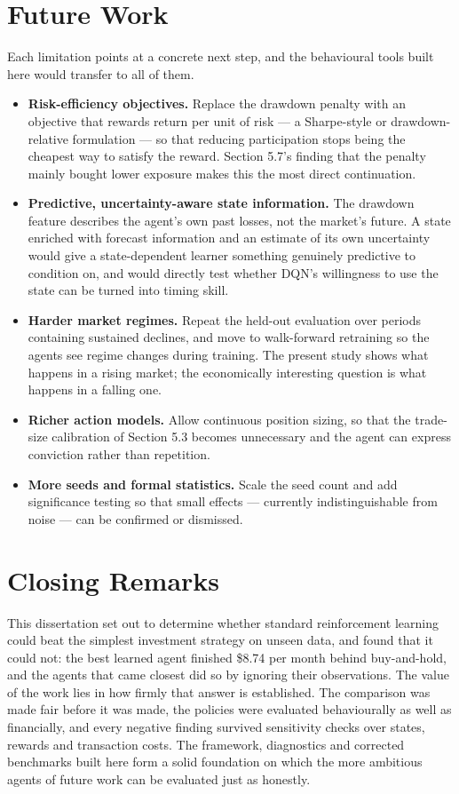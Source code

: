 \section{Future Work}

Each limitation points at a concrete next step, and the behavioural tools
built here would transfer to all of them.

\begin{itemize}
\item
  \textbf{Risk-efficiency objectives.} Replace the drawdown penalty with
  an objective that rewards return per unit of risk --- a Sharpe-style or
  drawdown-relative formulation --- so that reducing participation stops
  being the cheapest way to satisfy the reward. Section 5.7's finding
  that the penalty mainly bought lower exposure makes this the most
  direct continuation.
\item
  \textbf{Predictive, uncertainty-aware state information.} The drawdown
  feature describes the agent's own past losses, not the market's
  future. A state enriched with forecast information and an estimate of
  its own uncertainty would give a state-dependent learner something
  genuinely predictive to condition on, and would directly test whether
  DQN's willingness to use the state can be turned into timing skill.
\item
  \textbf{Harder market regimes.} Repeat the held-out evaluation over
  periods containing sustained declines, and move to walk-forward
  retraining so the agents see regime changes during training. The
  present study shows what happens in a rising market; the economically
  interesting question is what happens in a falling one.
\item
  \textbf{Richer action models.} Allow continuous position sizing, so
  that the trade-size calibration of Section 5.3 becomes unnecessary and
  the agent can express conviction rather than repetition.
\item
  \textbf{More seeds and formal statistics.} Scale the seed count and
  add significance testing so that small effects --- currently
  indistinguishable from noise --- can be confirmed or dismissed.
\end{itemize}

\section{Closing Remarks}

This dissertation set out to determine whether standard reinforcement
learning could beat the simplest investment strategy on unseen data, and
found that it could not: the best learned agent finished \$8.74 per month
behind buy-and-hold, and the agents that came closest did so by ignoring
their observations. The value of the work lies in how firmly that answer
is established. The comparison was made fair before it was made, the
policies were evaluated behaviourally as well as financially, and every
negative finding survived sensitivity checks over states, rewards and
transaction costs. The framework, diagnostics and corrected benchmarks
built here form a solid foundation on which the more ambitious agents of
future work can be evaluated just as honestly.
